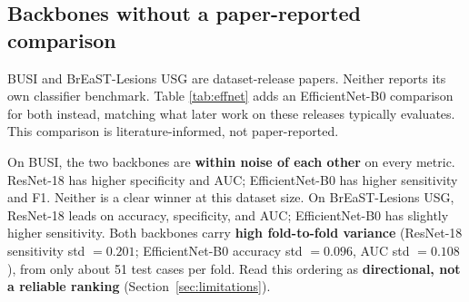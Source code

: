 \documentclass[11pt]{article}
\begin{document}
\subsection{Backbones without a paper-reported comparison}

BUSI and BrEaST-Lesions USG are dataset-release papers. Neither reports its
own classifier benchmark. Table \ref{tab:effnet} adds an EfficientNet-B0
comparison for both instead, matching what later work on these releases
typically evaluates. This comparison is literature-informed, not
paper-reported.

\begin{table}[htbp]
  \centering
  \caption{BUSI and BrEaST-Lesions USG: ResNet-18 vs.\ EfficientNet-B0, our 5-fold CV (mean $\pm$ std). Neither source paper reports its own classifier benchmark.}
  \label{tab:effnet}
\end{table}

On BUSI, the two backbones are \textbf{within noise of each other} on every
metric. ResNet-18 has higher specificity and AUC; EfficientNet-B0 has higher
sensitivity and F1. Neither is a clear winner at this dataset size. On
BrEaST-Lesions USG, ResNet-18 leads on accuracy, specificity, and AUC;
EfficientNet-B0 has slightly higher sensitivity. Both backbones carry
\textbf{high fold-to-fold variance} (ResNet-18 sensitivity std
$=\mathbf{0.201}$; EfficientNet-B0 accuracy std $=0.096$, AUC std $=0.108$),
from only about 51 test cases per fold. Read this ordering as
\textbf{directional, not a reliable ranking} (Section~\ref{sec:limitations}).
\end{document}
